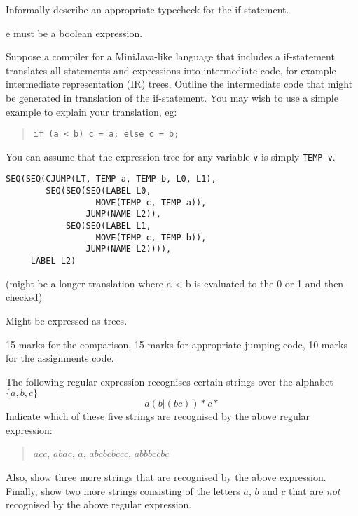 \documentclass[11pt]{bareexam}
\begin{document}
\begin{questions}
\begin{subquestions}
\begin{subsubquestions}
\subsubquestion
Informally describe an appropriate typecheck for the if-statement.

\begin{modelanswer}
e must be a boolean expression.
\end{modelanswer}

\subsubquestion

Suppose a compiler for a MiniJava-like language that includes
a if-statement translates all statements and expressions
into intermediate code, for example intermediate representation (IR) trees.
Outline the intermediate code that might be generated
in translation of the if-statement. You may wish to use a simple
example to explain your translation, eg:
\begin{quote}
\begin{verbatim}
if (a < b) c = a; else c = b;
\end{verbatim}
\end{quote}
You can assume that the expression tree for any variable \verb"v" is
simply \verb"TEMP v". 

\begin{modelanswer}
\begin{verbatim}
SEQ(SEQ(CJUMP(LT, TEMP a, TEMP b, L0, L1),
        SEQ(SEQ(SEQ(LABEL L0,
                  MOVE(TEMP c, TEMP a)),
                JUMP(NAME L2)),
            SEQ(SEQ(LABEL L1,
                  MOVE(TEMP c, TEMP b)),
                JUMP(NAME L2)))),
     LABEL L2)
\end{verbatim}
(might be a longer translation where a < b is evaluated to 
the 0 or 1 and then checked)

Might be expressed as trees.

15 marks for the comparison, 15 marks for appropriate jumping code, 10
marks for the assignments code.
\end{modelanswer}

\end{subsubquestions}

\end{subquestions}

\newpage

\question

\begin{subquestions}

\subquestion
The following regular expression recognises certain strings over the
alphabet $\{a,b,c\}$
\[
a(b|(bc))\!*c*
\]
Indicate which of these five strings are recognised by the above regular expression:
\begin{quote}
$acc$, $abac$, $a$, $abcbcbccc$, $abbbccbc$
\end{quote}
Also, show three more strings that are recognised by the above expression.
Finally, show two more strings consisting of 
the letters $a$, $b$ and $c$ that are \emph{not} 
recognised by the above regular expression.


\end{subquestions}
\end{questions}
\end{document}
